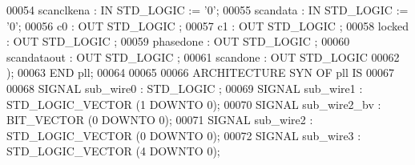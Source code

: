 \begin{DoxyCode}
{00054         \textcolor{vhdlchar}{scanclkena}      \textcolor{vhdlchar}{:} \textcolor{keywordflow}{IN} \textcolor{comment}{STD\_LOGIC}  \textcolor{vhdlchar}{:=} \textcolor{vhdlchar}{'}\textcolor{vhdllogic}{}\textcolor{vhdllogic}{0}\textcolor{vhdlchar}{'};
00055         \textcolor{vhdlchar}{scandata}        \textcolor{vhdlchar}{:} \textcolor{keywordflow}{IN} \textcolor{comment}{STD\_LOGIC}  \textcolor{vhdlchar}{:=} \textcolor{vhdlchar}{'}\textcolor{vhdllogic}{}\textcolor{vhdllogic}{0}\textcolor{vhdlchar}{'};
00056         \textcolor{vhdlchar}{c0}      \textcolor{vhdlchar}{:} \textcolor{keywordflow}{OUT} \textcolor{comment}{STD\_LOGIC} ;
00057         \textcolor{vhdlchar}{c1}      \textcolor{vhdlchar}{:} \textcolor{keywordflow}{OUT} \textcolor{comment}{STD\_LOGIC} ;
00058         locked      : \textcolor{keywordflow}{OUT} \textcolor{comment}{STD\_LOGIC} ;
00059         \textcolor{vhdlchar}{phasedone}       \textcolor{vhdlchar}{:} \textcolor{keywordflow}{OUT} \textcolor{comment}{STD\_LOGIC} ;
00060         \textcolor{vhdlchar}{scandataout}     \textcolor{vhdlchar}{:} \textcolor{keywordflow}{OUT} \textcolor{comment}{STD\_LOGIC} ;
00061         \textcolor{vhdlchar}{scandone}        \textcolor{vhdlchar}{:} \textcolor{keywordflow}{OUT} \textcolor{comment}{STD\_LOGIC} 
00062     \textcolor{vhdlchar}{)};
00063 \textcolor{keywordflow}{END} \textcolor{vhdlchar}{pll};
00064 
00065 
00066 \textcolor{keywordflow}{ARCHITECTURE} SYN \textcolor{keywordflow}{OF} pll IS
00067 
00068     \textcolor{keywordflow}{SIGNAL} \textcolor{vhdlchar}{sub_wire0}    \textcolor{vhdlchar}{:} \textcolor{comment}{STD\_LOGIC} ;
00069     \textcolor{keywordflow}{SIGNAL} \textcolor{vhdlchar}{sub_wire1}    \textcolor{vhdlchar}{:} \textcolor{comment}{STD\_LOGIC\_VECTOR} \textcolor{vhdlchar}{(}\textcolor{vhdllogic}{}\textcolor{vhdllogic}{1} \textcolor{keywordflow}{DOWNTO} \textcolor{vhdllogic}{}\textcolor{vhdllogic}{0}\textcolor{vhdlchar}{)};
00070     \textcolor{keywordflow}{SIGNAL} \textcolor{vhdlchar}{sub_wire2_bv} \textcolor{vhdlchar}{:} \textcolor{comment}{BIT\_VECTOR} \textcolor{vhdlchar}{(}\textcolor{vhdllogic}{}\textcolor{vhdllogic}{0} \textcolor{keywordflow}{DOWNTO} \textcolor{vhdllogic}{}\textcolor{vhdllogic}{0}\textcolor{vhdlchar}{)};
00071     \textcolor{keywordflow}{SIGNAL} \textcolor{vhdlchar}{sub_wire2}    \textcolor{vhdlchar}{:} \textcolor{comment}{STD\_LOGIC\_VECTOR} \textcolor{vhdlchar}{(}\textcolor{vhdllogic}{}\textcolor{vhdllogic}{0} \textcolor{keywordflow}{DOWNTO} \textcolor{vhdllogic}{}\textcolor{vhdllogic}{0}\textcolor{vhdlchar}{)};
00072     \textcolor{keywordflow}{SIGNAL} \textcolor{vhdlchar}{sub_wire3}    \textcolor{vhdlchar}{:} \textcolor{comment}{STD\_LOGIC\_VECTOR} \textcolor{vhdlchar}{(}\textcolor{vhdllogic}{}\textcolor{vhdllogic}{4} \textcolor{keywordflow}{DOWNTO} \textcolor{vhdllogic}{}\textcolor{vhdllogic}{0}\textcolor{vhdlchar}{)};
}
\end{DoxyCode}
